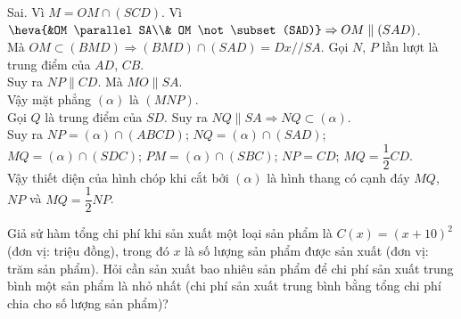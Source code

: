 \begin{ex}
{\begin{itemchoice}
			\itemch Sai. Vì $M=OM\cap (SCD)$.
			\itemch Vì $\heva{&OM \parallel SA\\& OM \not\subset (SAD)} \Rightarrow OM \parallel (SAD)$.\\
			Mà $ OM \subset (BMD) \Rightarrow (BMD)\cap(SAD)=Dx//SA$.
			\itemch Gọi $N$, $P$ lần lượt là trung điểm của $AD$, $CB$.\\
			Suy ra $NP \parallel CD$. Mà $MO \parallel SA$.\\
			Vậy mặt phẳng $(\alpha)$ là $(MNP)$.\\
			Gọi $Q$ là trung điểm của $SD$. Suy ra $NQ \parallel SA \Rightarrow NQ \subset (\alpha)$.\\
			Suy ra $NP=(\alpha)\cap (ABCD)$; $NQ=(\alpha)\cap (SAD)$; $MQ=(\alpha)\cap(SDC)$; $PM=(\alpha)\cap(SBC)$; $NP=CD$; $ MQ=\dfrac{1}{2}CD $.\\
			Vậy thiết diện của hình chóp khi cắt bởi $(\alpha)$ là hình thang có cạnh đáy $MQ$, $NP$ và $MQ=\dfrac{1}{2}NP$.
		\end{itemchoice}
	}
\end{ex}

\begin{ex}%
Giả sử hàm tổng chi phí khi sản xuất một loại sản phẩm là $C(x)=(x+10)^2$ (đơn vị: triệu đồng), trong đó $x$ là số lượng sản phẩm được sản xuất (đơn vị: trăm sản phẩm). Hỏi cần sản xuất bao nhiêu sản phẩm để chi phí sản xuất trung bình một sản phẩm là nhỏ nhất (chi phí sản xuất trung bình bằng tổng chi phí chia cho số lượng sản phẩm)?\\
\end{ex}

